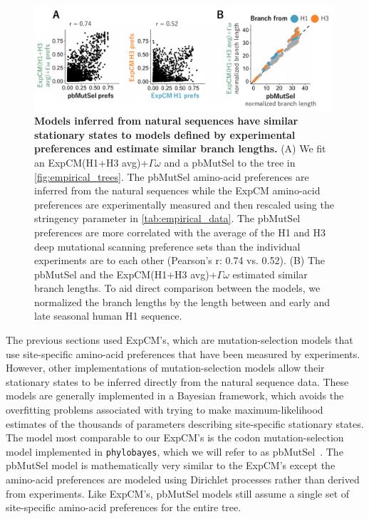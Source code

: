 \documentclass[11pt]{article}
\begin{document}
\begin{figure}
\centerline{\includegraphics[width=0.99\textwidth]{figures/phylobayes.pdf}}
\caption{\label{fig:phylobayes}
\textbf{Models inferred from natural sequences have similar stationary states to models defined by experimental preferences and estimate similar branch lengths.}
(A) We fit an ExpCM(H1+H3 avg)+$\Gamma\omega$ and a pbMutSel to the tree in \ref{fig:empirical_trees}. 
The pbMutSel amino-acid preferences are inferred from the natural sequences while the ExpCM amino-acid preferences are experimentally measured and then rescaled using the stringency parameter in \ref{tab:empirical_data}. 
The pbMutSel preferences are more correlated with the average of the H1 and H3 deep mutational scanning preference sets than the individual experiments are to each other (Pearson's r: 0.74 vs. 0.52). 
(B) The pbMutSel and the ExpCM(H1+H3 avg)+$\Gamma\omega$ estimated similar branch lengths. 
To aid direct comparison between the models, we normalized the branch lengths by the length between and early and late seasonal human H1 sequence. 
}
\end{figure}

The previous sections used ExpCM's, which are mutation-selection models that use site-specific amino-acid preferences that have been measured by experiments. 
However, other implementations of mutation-selection models allow their stationary states to be inferred directly from the natural sequence data. 
These models are generally implemented in a Bayesian framework, which avoids the overfitting problems associated with trying to make maximum-likelihood estimates of the thousands of parameters describing site-specific stationary states.
The model most comparable to our ExpCM's is the codon mutation-selection model implemented in \texttt{phylobayes}, which we will refer to as pbMutSel~\citep{rodrigue2014site}. 
The pbMutSel model is mathematically very similar to the ExpCM's except the amino-acid preferences are modeled using Dirichlet processes rather than derived from experiments. 
Like ExpCM's, pbMutSel models still assume a single set of site-specific amino-acid preferences for the entire tree.
\end{document}
